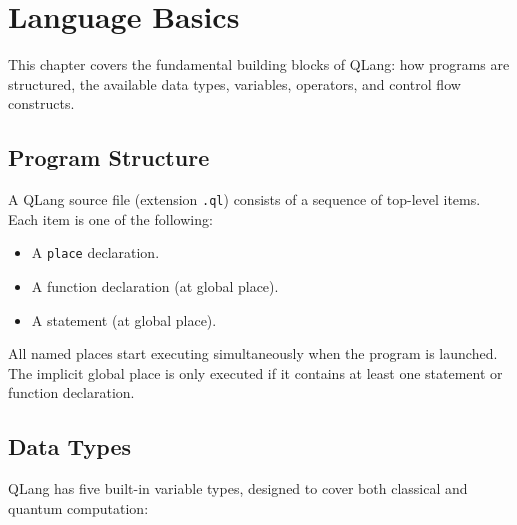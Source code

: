 \section{Language Basics}\label{sec:language-basics}

This chapter covers the fundamental building blocks of QLang: how programs are
structured, the available data types, variables, operators, and control flow
constructs.

\subsection{Program Structure}\label{sec:program-structure}

A QLang source file (extension \texttt{.ql}) consists of a sequence of
top-level items. Each item is one of the following:

\begin{itemize}
    \item A \texttt{place} declaration.
    \item A function declaration (at global place).
    \item A statement (at global place).
\end{itemize}

All named places start executing simultaneously when the program is launched.
The implicit global place is only
executed if it contains at least one statement or function declaration.



\subsection{Data Types}\label{sec:data-types}

QLang has five built-in variable types, designed to cover both classical and
quantum computation:

